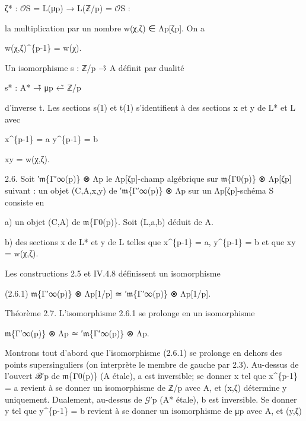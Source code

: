 \documentclass[11pt,a4paper]{article}
\begin{document}
ζ* : \ensuremath{\mathcal{O}}\textunderscore{}S = L(μ\textunderscore{}p) → L(ℤ/p) = \ensuremath{\mathcal{O}}\textunderscore{}S :

la multiplication par un nombre w(χ,ζ) ∈ Λ\textunderscore{}p[ζ\textunderscore{}p]. On a

w(χ,ζ)\textasciicircum{}\{p-1\} = w(χ).

Un isomorphisme s : ℤ/p →̃ A définit par dualité

s* : A* →̃ μ\textunderscore{}p ←̃ ℤ/p

d'inverse t. Les sections s(1) et t(1) s'identifient à des sections x et y de L* et L avec

x\textasciicircum{}\{p-1\} = a        y\textasciicircum{}\{p-1\} = b

xy = w(χ,ζ).

2.6. Soit ′\ensuremath{\mathfrak{m}}\textunderscore{}\{Γ′\textunderscore{}∞(p)\} ⊗ Λ\textunderscore{}p le Λ\textunderscore{}p[ζ\textunderscore{}p]-champ algébrique sur \ensuremath{\mathfrak{m}}\textunderscore{}\{Γ\textunderscore{}0(p)\} ⊗ Λ\textunderscore{}p[ζ\textunderscore{}p] suivant : un objet (C,A,x,y) de ′\ensuremath{\mathfrak{m}}\textunderscore{}\{Γ′\textunderscore{}∞(p)\} ⊗ Λ\textunderscore{}p sur un Λ\textunderscore{}p[ζ\textunderscore{}p]-schéma S consiste en

a) un objet (C,A) de \ensuremath{\mathfrak{m}}\textunderscore{}\{Γ\textunderscore{}0(p)\}. Soit (L,a,b) déduit de A.

b) des sections x de L* et y de L telles que x\textasciicircum{}\{p-1\} = a, y\textasciicircum{}\{p-1\} = b et que xy = w(χ,ζ).

Les constructions 2.5 et IV.4.8 définissent un isomorphisme

(2.6.1)        \ensuremath{\mathfrak{m}}\textunderscore{}\{Γ′\textunderscore{}∞(p)\} ⊗ Λ\textunderscore{}p[1/p] ≃ ′\ensuremath{\mathfrak{m}}\textunderscore{}\{Γ′\textunderscore{}∞(p)\} ⊗ Λ\textunderscore{}p[1/p].

Théorème 2.7. L'isomorphisme 2.6.1 se prolonge en un isomorphisme

\ensuremath{\mathfrak{m}}\textunderscore{}\{Γ′\textunderscore{}∞(p)\} ⊗ Λ\textunderscore{}p ≃ ′\ensuremath{\mathfrak{m}}\textunderscore{}\{Γ′\textunderscore{}∞(p)\} ⊗ Λ\textunderscore{}p.

Montrons tout d'abord que l'isomorphisme (2.6.1) se prolonge en dehors des points supersinguliers (on interprète le membre de gauche par 2.3). Au-dessus de l'ouvert ℬ′\textunderscore{}p de \ensuremath{\mathfrak{m}}\textunderscore{}\{Γ\textunderscore{}0(p)\} (A étale), a est inversible; se donner x tel que x\textasciicircum{}\{p-1\} = a revient à se donner un isomorphisme de ℤ/p avec A, et (x,ζ) détermine y uniquement. Dualement, au-dessus de \ensuremath{\mathcal{G}}′\textunderscore{}p (A* étale), b est inversible. Se donner y tel que y\textasciicircum{}\{p-1\} = b revient à se donner un isomorphisme de μ\textunderscore{}p avec A, et (y,ζ)
\end{document}
